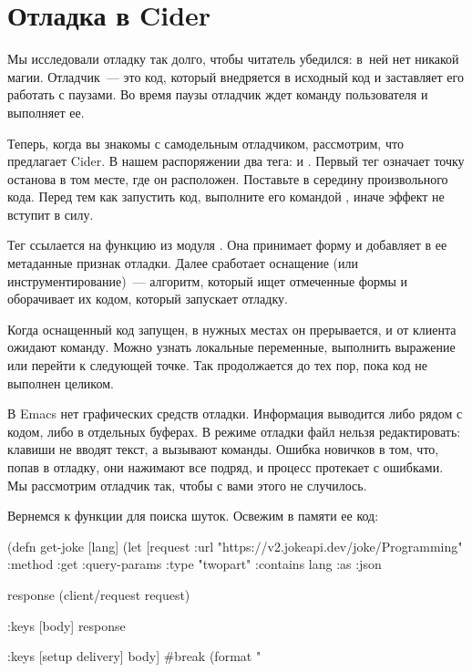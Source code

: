 \section{Отладка в Cider}


Мы исследовали отладку так долго, чтобы читатель убедился: в~ней нет никакой магии. Отладчик~--- это код, который внедряется в исходный код и заставляет его работать с паузами. Во время паузы отладчик ждет команду пользователя и выполняет ее.

Теперь, когда вы знакомы с самодельным отладчиком, рассмотрим, что предлагает Cider. В нашем распоряжении два тега:  и . Первый тег означает точку останова в том месте, где он расположен. Поставьте  в середину произвольного кода. Перед тем как запустить код, выполните его командой , иначе эффект не вступит в силу.

Тег  ссылается на функцию  из модуля . Она принимает форму и добавляет в ее метаданные признак отладки. Далее сработает оснащение (или инструментирование)~--- алгоритм, который ищет отмеченные формы и оборачивает их кодом, который запускает отладку.

Когда оснащенный код запущен, в нужных местах он прерывается, и от клиента ожидают команду. Можно узнать локальные переменные, выполнить выражение или перейти к следующей точке. Так продолжается до тех пор, пока код не выполнен целиком.

В Emacs нет графических средств отладки. Информация выводится либо рядом с кодом, либо в отдельных буферах. В режиме отладки файл нельзя редактировать: клавиши не вводят текст, а вызывают команды. Ошибка новичков в том, что, попав в отладку, они нажимают все подряд, и процесс протекает с ошибками. Мы рассмотрим отладчик так, чтобы с вами этого не случилось.


Вернемся к функции  для поиска шуток. Освежим в памяти ее код:

\begin{english}
  \begin{clojure}
(defn get-joke [lang]
  (let [request
        {:url "https://v2.jokeapi.dev/joke/Programming"
         :method :get
         :query-params {:type "twopart" :contains lang}
         :as :json}

        response
        (client/request request)

        {:keys [body]}
        response

        {:keys [setup delivery]}
        body]
    #break
    (format "%
  \end{clojure}
\end{english}

